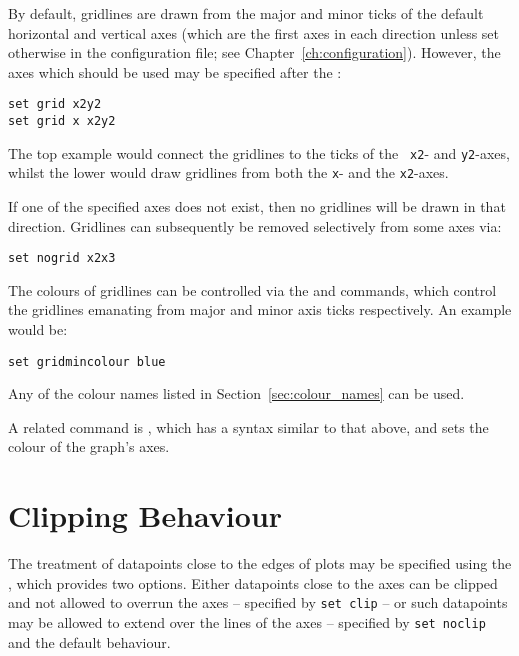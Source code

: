 \noindent By default, gridlines are drawn from the major and minor ticks of the
default horizontal and vertical axes (which are the first axes in each
direction unless set otherwise in the configuration file; see
Chapter~\ref{ch:configuration}).  However, the axes which should be used may be
specified after the :

\begin{verbatim}
set grid x2y2
set grid x x2y2
\end{verbatim}

\noindent The top example would connect the gridlines to the ticks of the {\tt
x2}- and {\tt y2}-axes, whilst the lower would draw gridlines from both the
{\tt x}- and the {\tt x2}-axes.

If one of the specified axes does not exist, then no gridlines will be drawn in
that direction.  Gridlines can subsequently be removed selectively from some
axes via:

\begin{verbatim}
set nogrid x2x3
\end{verbatim}

The colours of gridlines can be
controlled via the  and  commands, which control the gridlines emanating from major and
minor axis ticks respectively. An example would be:

\begin{verbatim}
set gridmincolour blue
\end{verbatim}

\noindent Any of the colour names listed in Section~\ref{sec:colour_names} can
be used.

A related command is , which has a syntax similar to that above, and sets the colour of
the graph's axes.\label{sec:set_colours}

\section{Clipping Behaviour}

The treatment of datapoints close to the edges of plots may be specified using
the , which provides two options. Either datapoints close to
the axes can be clipped and not allowed to overrun the axes -- specified by
{\tt set clip} -- or such datapoints may be allowed to extend over the lines of
the axes -- specified by {\tt set noclip} and the default behaviour.

